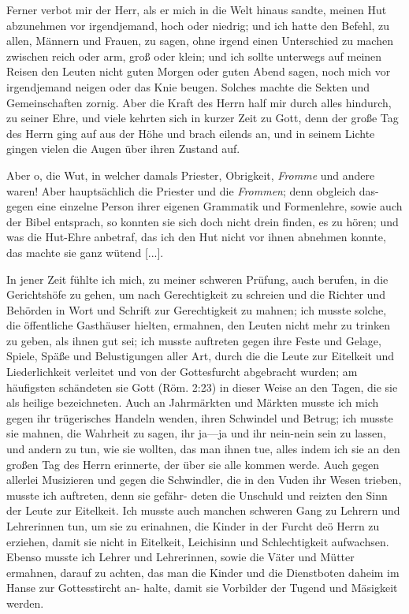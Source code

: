 Ferner verbot mir der Herr, als er mich in die Welt hinaus
sandte, meinen Hut abzunehmen 
vor irgendjemand, hoch oder
niedrig; und ich hatte den Befehl, zu allen, Männern und Frauen,
 zu sagen, ohne irgend einen Unterschied zu machen zwischen
reich oder arm, groß oder klein; und ich sollte unterwegs auf
meinen Reisen den Leuten nicht guten Morgen oder guten Abend
sagen, noch mich vor 
irgendjemand neigen oder das Knie beugen.
Solches machte die Sekten und Gemeinschaften 
zornig. Aber die
Kraft des Herrn  half mir durch alles hindurch, zu seiner Ehre,
und viele kehrten sich in kurzer Zeit zu Gott, denn der große
Tag des Herrn ging auf aus der Höhe und brach eilends an,
und in seinem Lichte gingen vielen die Augen über ihren 
Zustand auf.

Aber o, die Wut, in welcher damals Priester, Obrigkeit,
\textit{Fromme} und andere waren! Aber hauptsächlich die Priester
und die \textit{Frommen}; denn obgleich das-  gegen eine 
einzelne Person ihrer eigenen Grammatik und Formenlehre, sowie
auch der Bibel entsprach, so konnten sie sich doch nicht drein
finden, es zu hören; und was die Hut-Ehre anbetraf, das ich
den Hut nicht vor ihnen abnehmen konnte, das machte sie ganz
wütend [...].

In jener Zeit fühlte ich mich, zu meiner schweren Prüfung,
auch berufen, in die Gerichtshöfe zu gehen, um nach Gerechtigkeit
zu schreien und die Richter und Behörden in Wort und 
Schrift
zur Gerechtigkeit zu mahnen; ich musste solche, die öffentliche 
Gasthäuser hielten, ermahnen, den Leuten nicht mehr zu trinken 
zu
geben, als ihnen gut sei; ich musste auftreten gegen ihre Feste
und Gelage, Spiele, Späße und Belustigungen aller 
Art, durch
die die Leute zur Eitelkeit und Liederlichkeit verleitet und von
der Gottesfurcht abgebracht wurden; am häufigsten schändeten
sie Gott (Röm. 2:23) in dieser 
Weise an den Tagen, die sie als
heilige bezeichneten. Auch an Jahrmärkten 
und Märkten musste
ich mich gegen ihr trügerisches Handeln wenden, ihren Schwindel
und Betrug; ich musste sie mahnen, die Wahrheit 
zu sagen, ihr
ja—ja und ihr nein-nein sein zu lassen, und andern zu tun, wie
sie wollten, das man ihnen tue, alles indem ich sie an den großen
Tag des Herrn  erinnerte, der über sie alle kommen werde. Auch
gegen allerlei Musizieren und gegen die Schwindler, die in den
Vuden ihr Wesen trieben, musste ich auftreten, denn sie gefähr-
deten die Unschuld und reizten den Sinn der Leute zur Eitelkeit.
Ich musste auch manchen schweren Gang zu Lehrern und Lehrerinnen
tun, um sie zu erinahnen, die Kinder in der Furcht deö Herrn zu
erziehen, damit sie nicht in Eitelkeit, Leichisinn und Schlechtigkeit
aufwachsen. Ebenso musste ich Lehrer und Lehrerinnen, sowie die
Väter und Mütter ermahnen, darauf zu achten, das man die
Kinder und die Dienstboten daheim im Hanse zur Gottesstircht an-
halte, damit sie Vorbilder der Tugend und Mäsigkeit werden.

